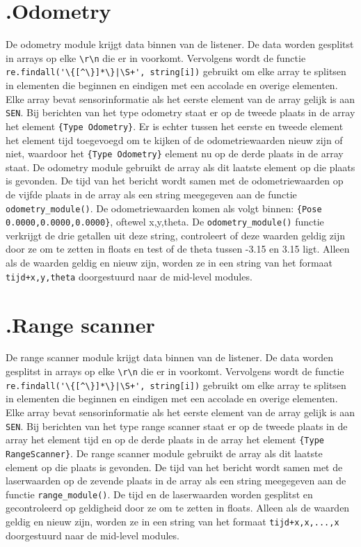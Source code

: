 \documentclass[a4paper,10pt]{article}
\begin{document}
\section*{\label{odometry}\thesection.\quad Odometry}
De odometry module krijgt data binnen van de listener. De data worden gesplitst in arrays op elke \verb!\r\n! die er in voorkomt. Vervolgens wordt de functie \verb!re.findall('\{[^\}]*\}|\S+', string[i])! gebruikt om elke array te splitsen in elementen die beginnen en eindigen met een accolade en overige elementen. Elke array bevat sensorinformatie als het eerste element van de array gelijk is aan \verb!SEN!. Bij berichten van het type odometry staat er op de tweede plaats in de array het element \verb!{Type Odometry}!. Er is echter tussen het eerste en tweede element het element tijd toegevoegd om te kijken of de odometriewaarden nieuw zijn of niet, waardoor het \verb!{Type Odometry}! element nu op de derde plaats in de array staat. De odometry module gebruikt de array als dit laatste element op die plaats is gevonden. De tijd van het bericht wordt samen met de odometriewaarden op de vijfde plaats in de array als een string meegegeven aan de functie \verb!odometry_module()!. De odometriewaarden komen als volgt binnen: \verb!{Pose 0.0000,0.0000,0.0000}!, oftewel x,y,theta. De \verb!odometry_module()! functie verkrijgt de drie getallen uit deze string, controleert of deze waarden geldig zijn door ze om te zetten in floats en test of de theta tussen -3.15 en 3.15 ligt. Alleen als de waarden geldig en nieuw zijn, worden ze in een string van het formaat \verb!tijd+x,y,theta! doorgestuurd naar de mid-level modules.

\section*{\label{rangescanner}\thesection.\quad Range scanner}
De range scanner module krijgt data binnen van de listener. De data worden gesplitst in arrays op elke \verb!\r\n! die er in voorkomt. Vervolgens wordt de functie \verb!re.findall('\{[^\}]*\}|\S+', string[i])! gebruikt om elke array te splitsen in elementen die beginnen en eindigen met een accolade en overige elementen. Elke array bevat sensorinformatie als het eerste element van de array gelijk is aan \verb!SEN!. Bij berichten van het type range scanner staat er op de tweede plaats in de array het element tijd en op de derde plaats in de array het element \verb!{Type RangeScanner}!. De range scanner module gebruikt de array als dit laatste element op die plaats is gevonden. De tijd van het bericht wordt samen met de laserwaarden op de zevende plaats in de array als een string meegegeven aan de functie \verb!range_module()!. De tijd en de laserwaarden worden gesplitst en gecontroleerd op geldigheid door ze om te zetten in floats. Alleen als de waarden geldig en nieuw zijn, worden ze in een string van het formaat \verb!tijd+x,x,...,x! doorgestuurd naar de mid-level modules.
\end{document}
